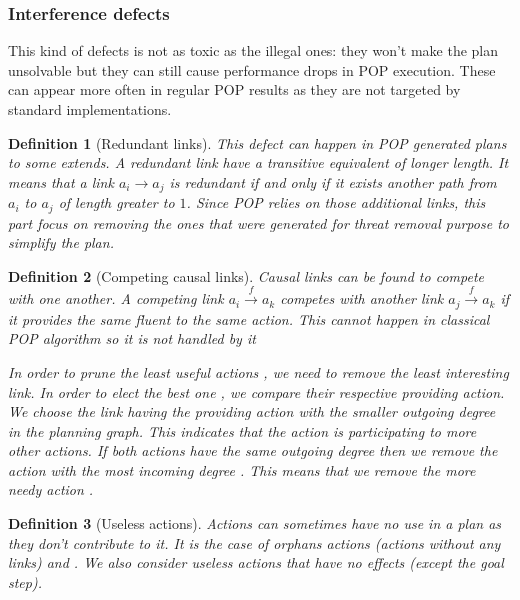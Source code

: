 \documentclass[]{article}
\newtheorem{definition}{Definition}
\begin{document}
\subsubsection{Interference defects}\label{interference-defects}

This kind of defects is not as toxic as the illegal ones: they won't
make the plan unsolvable but they can still cause performance drops in
POP execution. These can appear more often in regular POP results as
they are not targeted by standard implementations.

\begin{definition}[Redundant links]

This defect can happen in POP generated plans to some extends. A
redundant link have a transitive equivalent of longer length. It means
that a link \(a_i \to a_j\) is redundant if and only if it exists
another path from \(a_i\) to \(a_j\) of length greater to \(1\). Since
POP relies on those additional links, this part focus on removing the
ones that were generated for threat removal purpose to simplify the
plan.

\end{definition}

\begin{definition}[Competing causal links]

Causal links can be found to compete with one another. A competing link
\(a_i \xrightarrow{f} a_k\) competes with another link
\(a_j \xrightarrow{f} a_k\) if it provides the same fluent to the same
action. This cannot happen in classical POP algorithm so it is not
handled by it

In order to prune the least useful actions , we need to remove the least
interesting link. In order to elect the best one , we compare their
respective providing action. We choose the link having the providing
action with the smaller outgoing degree in the planning graph. This
indicates that the action is participating to more other actions. If
both actions have the same outgoing degree then we remove the action
with the most incoming degree . This means that we remove the more needy
action .

\end{definition}

\begin{definition}[Useless actions]

Actions can sometimes have no use in a plan as they don't contribute to
it. It is the case of orphans actions (actions without any links) and .
We also consider useless actions that have no effects (except the goal
step).

\end{definition}
\end{document}
